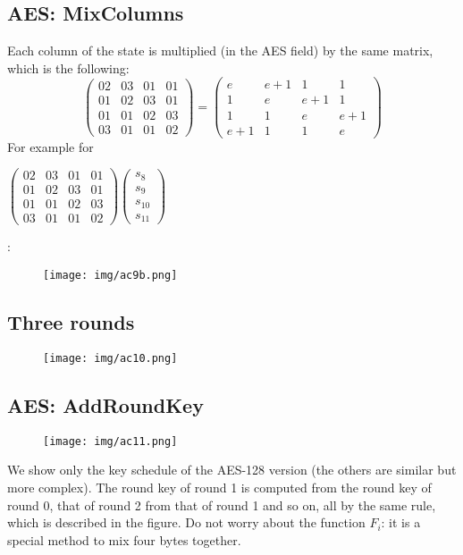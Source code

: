 \documentclass[a4paper, 10pt, titlepage]{article}
\begin{document}
\subsection{AES: MixColumns}
Each column of the state is multiplied (in the AES field) by the same
matrix, which is the following: 
$$ \left(
\begin{matrix}
02 & 03 & 01 & 01 \\
01 & 02 & 03 & 01 \\
01 & 01 & 02 & 03 \\
03 & 01 & 01 & 02 
\end{matrix} \right) = \left(
\begin{matrix}
e & e+1 & 1 & 1 \\
1 & e & e+1 & 1 \\
1 & 1 & e & e+1 \\
e+1 & 1 & 1 & e 
\end{matrix} \right)
$$
For example for \begin{footnotesize}
$\left(\begin{matrix}
02 & 03 & 01 & 01 \\
01 & 02 & 03 & 01 \\
01 & 01 & 02 & 03 \\
03 & 01 & 01 & 02 
\end{matrix}\right) \left( \begin{matrix}
s_8 \\
s_9 \\
s_{10} \\
s_{11} 
\end{matrix} \right)$
\end{footnotesize}:
\begin{figure}[h]
\centering
\texttt{[image: img/ac9b.png]}
\end{figure}
\subsection*{Three rounds}
\begin{figure}[h]
\centering
\texttt{[image: img/ac10.png]}
\end{figure}

\subsection{AES: AddRoundKey}
\begin{figure}[h]
\centering \texttt{[image: img/ac11.png]}
\end{figure}
We show only the key schedule of the AES-128 version (the others are similar but more complex).  The round key of round 1 is computed from the round key of round 0, that of round 2 from that of round 1   and so on, all by the same rule, which is described in the figure. Do not worry about the function $F_i$: it is a special method to mix four bytes together.
\end{document}
